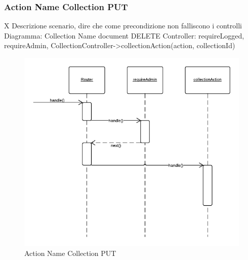 \subsubsection{Action Name Collection PUT} X
Descrizione scenario, dire che come precondizione non falliscono i controlli
Diagramma: Collection Name document DELETE
Controller: requireLogged, requireAdmin, CollectionController->collectionAction(action, collectionId)
\begin{figure}[H]
	\begin{center} 
		\includegraphics[scale=0.60]{scenari/Action Name Collection PUT.png} 
		\caption{Action Name Collection PUT}
	\end{center} 
\end{figure}

